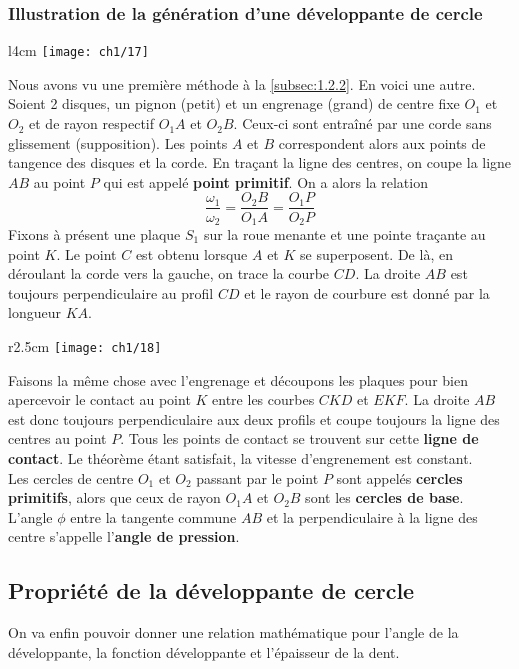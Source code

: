 \subsubsection{Illustration de la génération d'une développante de cercle}
\begin{wrapfigure}[12]{l}{4cm}
	\vspace{-5mm}
	\texttt{[image: ch1/17]}
\end{wrapfigure}	
Nous avons vu une première méthode à la \autoref{subsec:1.2.2}. En voici une autre. Soient 2 disques, un pignon (petit) et un engrenage (grand) de centre fixe $O_1$ et $O_2$ et de rayon respectif $O_1A$ et $O_2B$. Ceux-ci sont entraîné par une corde sans glissement (supposition). Les points $A$ et $B$ correspondent alors aux points de tangence des disques et la corde. En traçant la ligne des centres, on coupe la ligne $AB$ au point $P$ qui est appelé \textbf{point primitif}. On a alors la relation 
\begin{equation}
	\frac{\omega _1}{\omega _2} = \frac{O_2B}{O_1A} = \frac{O_1P}{O_2P}
\end{equation}
Fixons à présent une plaque $S_1$ sur la roue menante et une pointe traçante au point $K$. Le point $C$ est obtenu lorsque $A$ et $K$ se superposent. De là, en déroulant la corde vers la gauche, on trace la courbe $CD$. La droite $AB$ est toujours perpendiculaire au profil $CD$ et le rayon de courbure est donné par la longueur $KA$.	\\
	
\begin{wrapfigure}[12]{r}{2.5cm}
	\vspace{-5mm}
	\texttt{[image: ch1/18]}
\end{wrapfigure}	
Faisons la même chose avec l'engrenage et découpons les plaques pour bien apercevoir le contact au point $K$ entre les courbes $CKD$ et $EKF$. La droite $AB$ est donc toujours perpendiculaire aux deux profils et coupe toujours la ligne des centres au point $P$. Tous les points de contact se trouvent sur cette \textbf{ligne de contact}. Le théorème étant satisfait, la vitesse d'engrenement est constant. \\
Les cercles de centre $O_1$ et $O_2$ passant par le point $P$ sont appelés \textbf{cercles primitifs}, alors que ceux de rayon $O_1A$ et $O_2B$ sont les \textbf{cercles de base}. L'angle $\phi$ entre la tangente commune $AB$ et la perpendiculaire à la ligne des centre s'appelle l'\textbf{angle de pression}.
	
\subsection{Propriété de la développante de cercle}
On va enfin pouvoir donner une relation mathématique pour l'angle de la développante, la fonction développante et l'épaisseur de la dent. 
	
